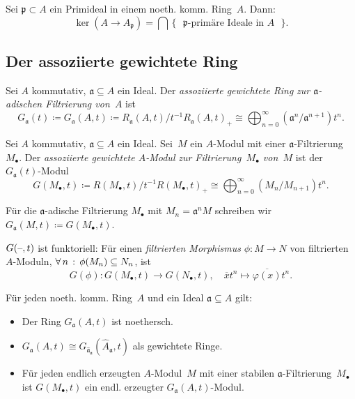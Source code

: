 \documentclass{cheat-sheet}
\newcommand{\aaa}{\mathfrak{a}}
\newcommand{\ppp}{\mathfrak{p}}
\begin{document}
\begin{kor}
  Sei $\ppp \subset A$ ein Primideal in einem noeth. komm. Ring~$A$.
  Dann:
  \[
    \ker (A \to A_\ppp) = \bigcap \, \{ \text{ $\ppp$-primäre Ideale in $A$ } \}.
  \]
\end{kor}

\subsection{Der assoziierte gewichtete Ring}


\begin{defn}
  Sei $A$ kommutativ, $\aaa \subseteq A$ ein Ideal.
  Der \emph{assoziierte gewichtete Ring} \textit{zur $\aaa$-adischen Filtrierung von~$A$} ist
  \[
    G_\aaa (t) \coloneqq G_\aaa (A, t) \coloneqq R_\aaa (A, t) / t^{-1} R_\aaa (A, t)_{+} \cong {\bigoplus}_{n=0}^\infty (\aaa^n / \aaa^{n+1}) t^n.
  \]
\end{defn}

\begin{defn}
  Sei $A$ kommutativ, $\aaa \subseteq A$ ein Ideal.
  Sei~$M$ ein $A$-Modul mit einer $\aaa$-Filtrierung~$M_\bullet$.
  Der \emph{assoziierte gewichtete $A$-Modul} \textit{zur Filtrierung~$M_\bullet$ von~$M$} ist der $G_\aaa(t)$-Modul
  \[
    G(M_\bullet, t) \coloneqq R(M_\bullet, t) / t^{-1} R(M_\bullet, t)_{+} \cong \bigoplus_{n=0}^\infty (M_n / M_{n+1}) t^n.
  \]
\end{defn}

\begin{nota}
  Für die $\aaa$-adische Filtrierung $M_\bullet$ mit $M_n = \aaa^n M$ schreiben wir $G_\aaa(M, t) \coloneqq G(M_\bullet, t)$.
\end{nota}

\begin{bem}
  $G(\text{--}, t)$ ist funktoriell:
  Für einen \textit{filtrierten Morphismus} $\phi : M \to N$ von filtrierten $A$-Moduln, \dh{} $\forall \, {n} \,:\, \phi(M_n) \subseteq N_n$, ist
  \[
    G(\phi) : G(M_\bullet, t) \to G(N_\bullet, t), \quad
    \overline{x} t^n \mapsto \overline{\varphi(x)} t^n.
  \]
\end{bem}

\begin{prop}
  Für jeden noeth. komm. Ring~$A$ und ein Ideal $\aaa \subseteq A$ gilt:
  \begin{itemize}
    \item Der Ring $G_\aaa(A, t)$ ist noethersch.
    \item $G_\aaa(A, t) \cong G_{\hat{\aaa}_\aaa}(\hat{A}_\aaa, t)$ als gewichtete Ringe.
    \item Für jeden endlich erzeugten $A$-Modul~$M$ mit einer stabilen $\aaa$-Filtrierung~$M_\bullet$ ist $G(M_\bullet, t)$ ein endl. erzeugter $G_\aaa(A, t)$-Modul.
  \end{itemize}
\end{prop}
\end{document}
